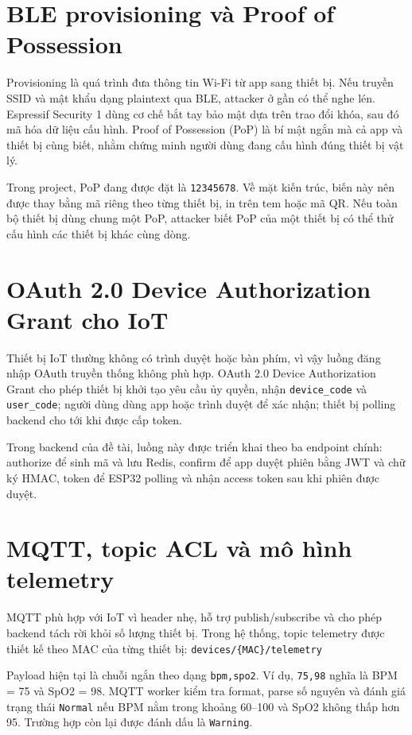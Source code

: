 \documentclass[a4paper,13pt,3p,oneside]{report}
\begin{document}
\section{BLE provisioning và Proof of Possession}
Provisioning là quá trình đưa thông tin Wi-Fi từ app sang thiết bị. Nếu truyền SSID và mật khẩu dạng plaintext qua BLE, attacker ở gần có thể nghe lén. Espressif Security 1 dùng cơ chế bắt tay bảo mật dựa trên trao đổi khóa, sau đó mã hóa dữ liệu cấu hình. Proof of Possession (PoP) là bí mật ngắn mà cả app và thiết bị cùng biết, nhằm chứng minh người dùng đang cấu hình đúng thiết bị vật lý.

Trong project, PoP đang được đặt là \texttt{12345678}. Về mặt kiến trúc, biến này nên được thay bằng mã riêng theo từng thiết bị, in trên tem hoặc mã QR. Nếu toàn bộ thiết bị dùng chung một PoP, attacker biết PoP của một thiết bị có thể thử cấu hình các thiết bị khác cùng dòng.

\section{OAuth 2.0 Device Authorization Grant cho IoT}
Thiết bị IoT thường không có trình duyệt hoặc bàn phím, vì vậy luồng đăng nhập OAuth truyền thống không phù hợp. OAuth 2.0 Device Authorization Grant cho phép thiết bị khởi tạo yêu cầu ủy quyền, nhận \texttt{device\_code} và \texttt{user\_code}; người dùng dùng app hoặc trình duyệt để xác nhận; thiết bị polling backend cho tới khi được cấp token.

Trong backend của đề tài, luồng này được triển khai theo ba endpoint chính: authorize để sinh mã và lưu Redis, confirm để app duyệt phiên bằng JWT và chữ ký HMAC, token để ESP32 polling và nhận access token sau khi phiên được duyệt.

\section{MQTT, topic ACL và mô hình telemetry}
MQTT phù hợp với IoT vì header nhẹ, hỗ trợ publish/subscribe và cho phép backend tách rời khỏi số lượng thiết bị. Trong hệ thống, topic telemetry được thiết kế theo MAC của từng thiết bị: \texttt{devices/\{MAC\}/telemetry}

Payload hiện tại là chuỗi ngắn theo dạng \texttt{bpm,spo2}. Ví dụ, \texttt{75,98} nghĩa là BPM = 75 và SpO2 = 98. MQTT worker kiểm tra format, parse số nguyên và đánh giá trạng thái \texttt{Normal} nếu BPM nằm trong khoảng 60--100 và SpO2 không thấp hơn 95. Trường hợp còn lại được đánh dấu là \texttt{Warning}.
\end{document}
